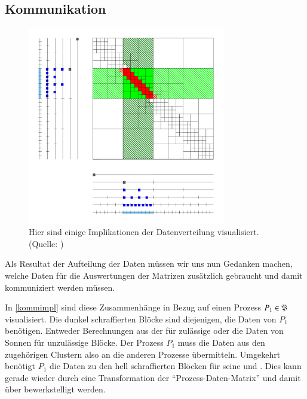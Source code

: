   \subsection{Kommunikation}
  \label{sec:komm}
    \begin{figure}[t]
      \includegraphics[width=0.77\textwidth]{img/kommimpl.png}
      \caption{Hier sind einige Implikationen der Datenverteilung visualisiert.\\
	       (Quelle: \citet{h2slides})}
      \label{fig:kommimpl}
    \end{figure}

    Als Resultat der Aufteilung der Daten müssen wir uns nun Gedanken machen, welche Daten für die Auswertungen der Matrizen zusätzlich gebraucht und damit kommuniziert werden müssen.
    
    In \autoref{kommimpl} sind diese Zusammenhänge in Bezug auf einen Prozess $P_1 \in \mathfrak{P}$ visualisiert. Die dunkel schraffierten Blöcke sind diejenigen, die Daten von $P_1$ benötigen. 
    Entweder Berechnungen aus der \vorw für zulässige oder die Daten von Sonnen für unzulässige Blöcke. Der Prozess $P_1$ muss die Daten aus den zugehörigen Clustern also an die anderen Prozesse 
    übermitteln. Umgekehrt benötigt $P_1$ die Daten zu den hell schraffierten Blöcken für seine \koppl und \ruckw. Dies kann gerade wieder durch eine Transformation der ``Prozess-Daten-Matrix'' 
    und damit über  bewerkstelligt werden. 
    
